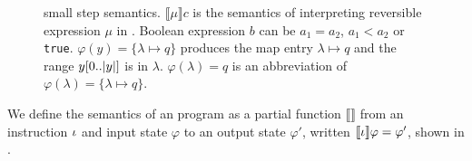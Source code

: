 \begin{figure}[t]
{{\begin{mathpar}
  \end{mathpar}
}
}
  \caption{\qafny small step semantics. $\llbracket \mu \rrbracket c$ is the \oqasm semantics of interpreting reversible expression $\mu$ in . Boolean expression $b$ can be $a_1=a_2$, $a_1 < a_2$ or \texttt{true}.
$\varphi(y)=\{\lambda\mapsto q\}$ produces the map entry $\lambda\mapsto q$ and the range $y[0..\slen{y}]$ is in $\lambda$.
$\varphi(\lambda)=q$ is an abbreviation of $\varphi(\lambda)=\{\lambda\mapsto q\}$.}
  \label{fig:exp-semantics}
\end{figure}

We define the semantics of an \oqasm program as a partial function
$\llbracket\rrbracket$ from
an instruction $\instr$ and input state $\varphi$ to an output state
$\varphi'$, written 
$\llbracket \instr \rrbracket\varphi=\varphi'$, shown in .




